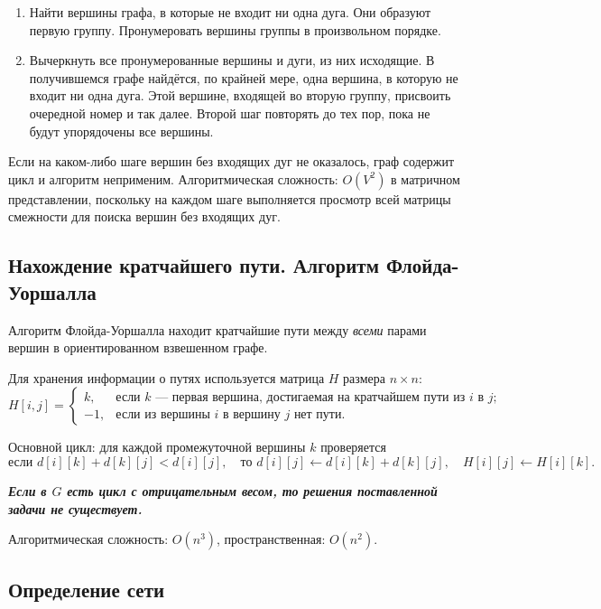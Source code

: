 \begin{enumerate}
    \item Найти вершины графа, в которые не входит ни одна дуга.
    Они образуют первую группу. Пронумеровать вершины группы в произвольном порядке.

    \item Вычеркнуть все пронумерованные вершины и дуги, из них исходящие.
    В получившемся графе найдётся, по крайней мере, одна вершина, в которую
    не входит ни одна дуга. Этой вершине, входящей во вторую группу, присвоить
    очередной номер и так далее. Второй шаг повторять до тех пор, пока не будут
    упорядочены все вершины.
\end{enumerate}

Если на каком-либо шаге вершин без входящих дуг не оказалось, граф содержит
цикл и алгоритм неприменим. Алгоритмическая сложность: $O(V^2)$ в матричном
представлении, поскольку на каждом шаге выполняется просмотр всей матрицы
смежности для поиска вершин без входящих дуг.

\subsection{Нахождение кратчайшего пути. Алгоритм Флойда-Уоршалла}

Алгоритм Флойда-Уоршалла находит кратчайшие пути между \textit{всеми} парами
вершин в ориентированном взвешенном графе.

Для хранения информации о путях используется матрица $H$ размера $n \times n$:
\[
H[i, j] =
\begin{cases}
    k, & \text{если $k$~--- первая вершина, достигаемая на кратчайшем
    пути из $i$ в $j$;} \\
    -1, & \text{если из вершины $i$ в вершину $j$ нет пути.}
\end{cases}
\]

Основной цикл: для каждой промежуточной вершины $k$ проверяется
\[
    \text{если } d[i][k] + d[k][j] < d[i][j], \quad
    \text{то } d[i][j] \leftarrow d[i][k] + d[k][j], \quad H[i][j] \leftarrow H[i][k].
\]

\textbf{\textit{Если в $G$ есть цикл с отрицательным весом, то решения
поставленной задачи не существует.}}

Алгоритмическая сложность: $O(n^3)$, пространственная: $O(n^2)$.

\subsection{Определение сети}

